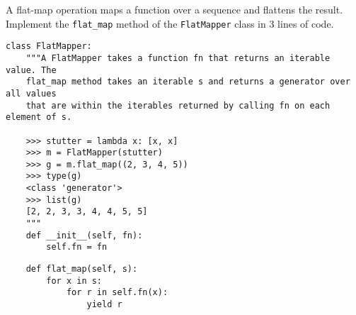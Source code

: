 \begin{blocksection}
\question A flat-map operation maps a function over a sequence and flattens the result. Implement the \lstinline$flat_map$ method of the \lstinline$FlatMapper$ class in 3 lines of code.

\begin{lstlisting}
class FlatMapper:
    """A FlatMapper takes a function fn that returns an iterable value. The
    flat_map method takes an iterable s and returns a generator over all values
    that are within the iterables returned by calling fn on each element of s.

    >>> stutter = lambda x: [x, x]
    >>> m = FlatMapper(stutter)
    >>> g = m.flat_map((2, 3, 4, 5))
    >>> type(g)
    <class 'generator'>
    >>> list(g)
    [2, 2, 3, 3, 4, 4, 5, 5]
    """
    def __init__(self, fn):
        self.fn = fn
\end{lstlisting}

\begin{solution}[1in]
\begin{lstlisting}
    def flat_map(self, s):
        for x in s:
            for r in self.fn(x):
                yield r
\end{lstlisting}
\end{solution}

\end{blocksection}
